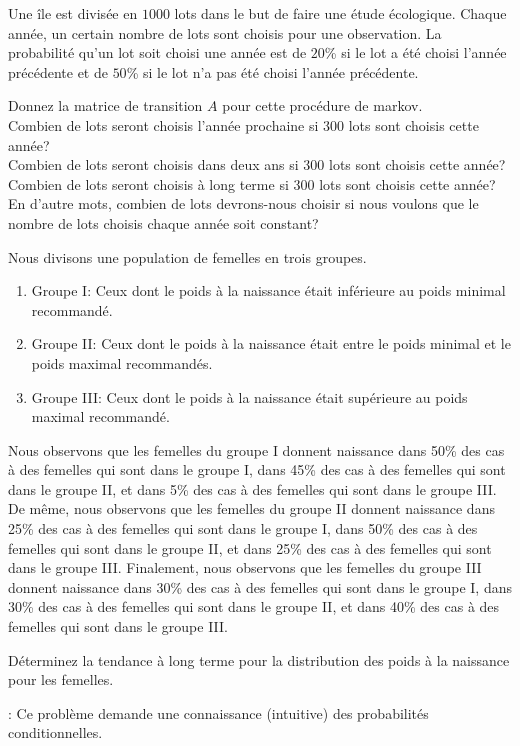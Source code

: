 \begin{question}[\eco]
Une île est divisée en $1000$ lots dans le but de faire une étude
écologique.  Chaque année, un certain nombre de lots sont choisis pour
une observation.  La probabilité qu'un lot soit choisi une année est
de $20$\% si le lot a été choisi l'année précédente et de $50$\% si le
lot n'a pas été choisi l'année précédente.

 Donnez la matrice de transition $A$ pour cette procédure de
markov.\\
 Combien de lots seront choisis l'année prochaine si $300$
lots sont choisis cette année?\\
 Combien de lots seront choisis dans deux ans si $300$ lots
sont choisis cette année?\\ 
 Combien de lots seront choisis à long terme si $300$ lots
sont choisis cette année?   En d'autre mots, combien de lots 
devrons-nous choisir si nous voulons que le nombre de lots choisis chaque
année soit constant?
\label{12Q14}
\end{question}

\begin{question}[\eco]
Nous divisons une population de femelles en trois groupes.
\begin{enumerate}
\item Groupe I: Ceux dont le poids à la naissance était inférieure au poids
minimal recommandé.
\item Groupe II: Ceux dont le poids à la naissance était entre le poids
minimal et le poids maximal recommandés.
\item Groupe III: Ceux dont le poids à la naissance était supérieure au poids
maximal recommandé.
\end{enumerate}
Nous observons que les femelles du groupe I donnent naissance dans 50\%
des cas à des femelles qui sont dans le groupe I, dans 45\% des cas à
des femelles qui sont dans le groupe II, et dans 5\% des cas à des
femelles qui sont dans le groupe III.  De même, nous observons que les
femelles du groupe II donnent naissance dans 25\% des cas à des
femelles qui sont dans le groupe I, dans 50\% des cas à des femelles
qui sont dans le groupe II, et dans 25\% des cas à des femelles qui
sont dans le groupe III.  Finalement, nous observons que les femelles du
groupe III donnent naissance dans 30\% des cas à des femelles qui sont
dans le groupe I, dans 30\% des cas à des femelles qui sont dans le
groupe II, et dans 40\% des cas à des femelles qui sont dans le groupe
III.

Déterminez la tendance à long terme pour la distribution des poids à
la naissance pour les femelles.

: Ce problème demande une connaissance
(intuitive) des probabilités conditionnelles.
\label{12Q15}
\end{question}


